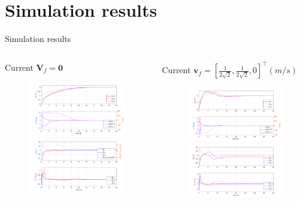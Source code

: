 \documentclass{beamer}
\begin{document}
\section{Simulation results}
\begin{frame}{Simulation results}
	\begin{columns}
		\begin{block}{Current $\mathbf{V}_f = \mathbf{0}$}
			\begin{figure}
				\includegraphics[width = 58mm]{Images/Data_sansCurrent_pos_RollPitch_Yaw2.pdf}\\
				\includegraphics[width = 58mm]{Images/Data_sansCurrent_Fc_Gc2.pdf}
			\end{figure}
		\end{block}	
		\begin{block}{Current $\mathbf{v}_f = [\frac{1}{2\sqrt{2}}, \frac{1}{2\sqrt{2}}, 0 ]^{\top} (m/s)$}
			\begin{figure}
				\includegraphics[width = 58mm]{Images/Data_avecCurrent_pos_RollPitch_Yaw2.pdf}\\
				\includegraphics[width = 58mm]{Images/Data_avecCurrent_Fc_Gc2.pdf}
			\end{figure}
		\end{block}	
	\end{columns}
\end{frame}
\end{document}
